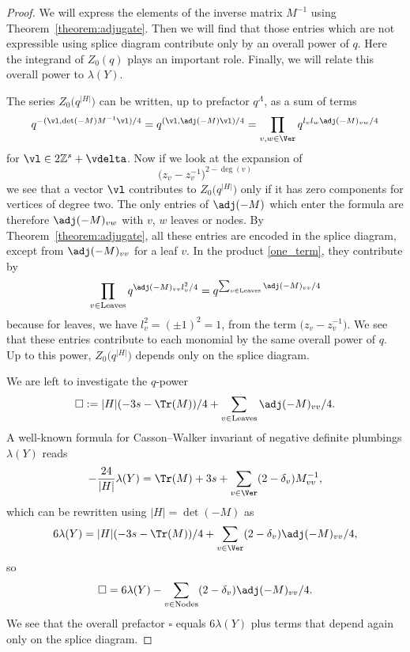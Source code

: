 \documentclass[pdftex]{sigma}
\begin{document}
\begin{proof}
	We will express the elements of the inverse matrix $M^{-1}$ using Theorem~\ref{theorem:adjugate}. Then we will find that those entries which are not expressible using splice diagram contribute only by an overall power of $q$. Here the integrand of $Z_0(q)$ plays an important role. Finally, we will relate this overall power to $\lambda(Y)$.
	
	The series $Z_0\bigl(q^{|H|}\bigr)$ can be written, up to prefactor $q^\Lambda$, as a sum of terms
	\begin{equation}\label{one_term}
		q^{-(\vl, \det(-M) M^{-1}\vl)/4} = q^{(\vl, \adj(-M)\vl)/4} = \prod_{v, w \in \Ver} q^{l_v l_w\adj(-M)_{vw}/4}
	\end{equation}
 for $\vl \in 2\mathbb{Z}^s+\vdelta$. Now if we look at the expansion of
	\begin{equation}
		\bigl( z_v - z_v^{-1}\bigr)^{2-\deg(v)}
	\end{equation}
	we see that a vector $\vl$ contributes to $Z_0\bigl(q^{|H|}\bigr)$ only if it has zero components for vertices of degree two. The only entries of $\adj(-M)$ which enter the formula are therefore $\adj(-M)_{vw}$ with $v$, $w$ leaves or nodes. By Theorem~\ref{theorem:adjugate}, all these entries are encoded in the splice diagram, except from $\adj(-M)_{vv}$ for a leaf $v$. In the product \eqref{one_term}, they contribute by
	\begin{equation}\label{one_term_power}
		\prod_{v \in \text{Leaves}} q^{\adj(-M)_{vv} l^2_v/4} = q^{\sum_{v \in \text{Leaves}} \adj(-M)_{vv}/4}
	\end{equation}
	because for leaves, we have $l_v^2 = (\pm 1)^2 = 1$, from the term $\bigl(z_v-z_v^{-1}\bigr)$. We see that these entries contribute to each monomial by the same overall power of $q$. Up to this power, $Z_0\bigl(q^{|H|}\bigr)$ depends only on the splice diagram.

	We are left to investigate the $q$-power
	\[
		\square := |H|(-3s-\Tr(M))/4 +\sum_{v \in \text{Leaves}} \adj(-M)_{vv}/4.
	\]
	A well-known formula for Casson--Walker invariant of negative definite plumbings $\lambda(Y)$ reads~\cite[p.\ 296]{NeNi02}
	\begin{equation}\label{eq:casson_formula}
		-\frac{24}{|H|}\lambda(Y) = \Tr(M) + 3s + \sum_{v \in \Ver} (2-\delta_v) M^{-1}_{vv},
	\end{equation}
 which can be rewritten using $|H|=\det(-M)$ as
 \begin{equation}\label{eq:casson_formula_adj}
		6\lambda(Y) = |H|(-3s-\Tr(M))/4 + \sum_{v \in \Ver} (2-\delta_v) \adj(-M)_{vv}/4,
	\end{equation}
	so
	\[
	\square = 6\lambda(Y) - \sum_{v \in \text{Nodes}} (2-\delta_v) \adj(-M)_{vv}/4.
	\]
	We see that the overall prefactor $\square$ equals $6\lambda(Y)$ plus terms that depend again only on the splice diagram.
\end{proof}
\end{document}
